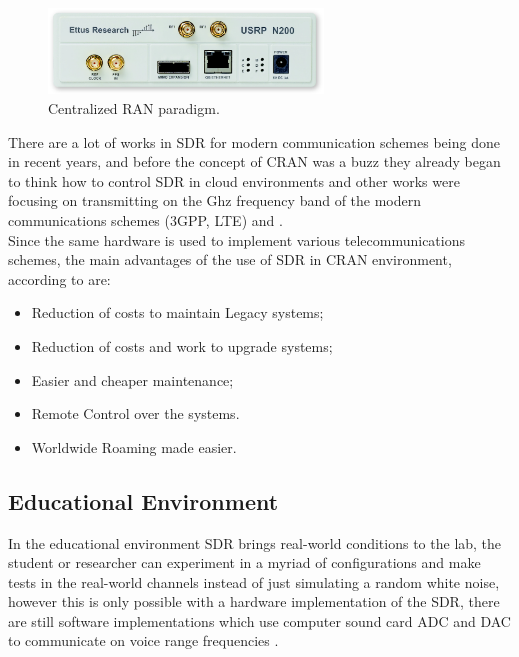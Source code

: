 \begin{figure}[htbp]
    \centering
    \includegraphics[width=0.65\textwidth]{./figures/usrp}
    \caption{ Centralized RAN paradigm.
    \label{fig:cran}}
\end{figure}

There are a lot of works in SDR for modern communication schemes being done in
recent years, and before the concept of CRAN was a buzz they already began to
think how to control SDR in cloud environments \cite{dayananda2012} and other
works were focusing on transmitting on the Ghz frequency band of the modern
communications schemes (3GPP, LTE) \cite{kelley2009} and \cite{neenu2014}.\\

Since the same hardware is used to implement various telecommunications schemes,
the main advantages of the use of SDR in CRAN environment, according to
\cite{dayananda2012} are:

\begin{itemize}
    \item Reduction of costs to maintain Legacy systems;
    \item Reduction of costs and work to upgrade systems;
    \item Easier and cheaper maintenance;
    \item Remote Control over the systems.
    \item Worldwide Roaming made easier.
\end{itemize}


\subsection{Educational Environment}

In the educational environment SDR brings real-world conditions to the lab, the
student or researcher can experiment in a myriad of configurations and make
tests in the real-world channels instead of just simulating a random white
noise, however this is only possible with a hardware implementation of the SDR,
there are still software implementations which use computer sound card ADC and
DAC to communicate on voice range frequencies \cite{ladimer2009}.\\

